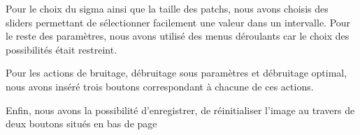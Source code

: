 Pour le choix du sigma ainsi que la taille des patchs, nous avons choisis des sliders permettant de sélectionner facilement une valeur dans un intervalle. Pour le reste des paramètres, nous avons utilisé des menus déroulants car le choix des possibilités était restreint. \par
Pour les actions de bruitage, débruitage sous paramètres et débruitage optimal, nous avons inséré trois boutons correspondant à chacune de ces actions. \par
Enfin, nous avons la possibilité d'enregistrer, de réinitialiser l'image au travers de deux boutons situés en bas de page